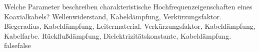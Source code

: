     {Welche Parameter beschreiben charakteristische Hochfrequenzeigenschaften eines Koaxialkabels?}
    {Wellenwiderstand, Kabeldämpfung, Verkürzungsfaktor.}
    {Biegeradius, Kabeldämpfung, Leitermaterial.}
    {Verkürzungsfaktor, Kabeldämpfung, Kabelfarbe.}
    {Rückflußdämpfung, Dielektrizitätskonstante, Kabeldämpfung.}
    {false}{false}
